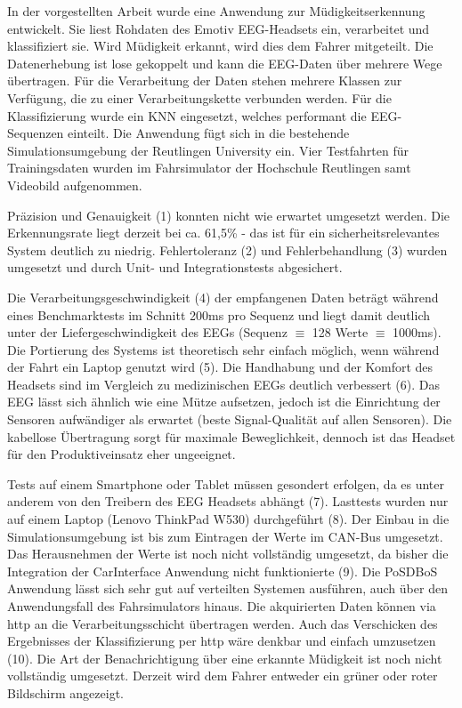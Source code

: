 \label{chap:result}
In der vorgestellten Arbeit wurde eine Anwendung zur Müdigkeitserkennung entwickelt. Sie liest Rohdaten des Emotiv EEG-Headsets ein, verarbeitet und klassifiziert sie. Wird Müdigkeit erkannt, wird dies dem Fahrer mitgeteilt. 
Die Datenerhebung ist lose gekoppelt und kann die EEG-Daten über mehrere Wege übertragen. Für die Verarbeitung der Daten stehen mehrere Klassen zur Verfügung, die zu einer Verarbeitungskette verbunden werden. Für die Klassifizierung wurde ein KNN eingesetzt, welches performant die EEG-Sequenzen einteilt. Die Anwendung fügt sich in die bestehende Simulationsumgebung der Reutlingen University ein. Vier Testfahrten für Trainingsdaten wurden im Fahrsimulator der Hochschule Reutlingen samt Videobild aufgenommen.

Präzision und Genauigkeit (1) konnten nicht wie erwartet umgesetzt werden. Die Erkennungsrate liegt derzeit bei ca. 61,5\% - das ist für ein sicherheitsrelevantes System deutlich zu niedrig. 
Fehlertoleranz (2) und Fehlerbehandlung (3) wurden umgesetzt und durch Unit- und Integrationstests abgesichert. 

Die Verarbeitungsgeschwindigkeit (4) der empfangenen Daten beträgt während eines Benchmarktests im Schnitt 200ms pro Sequenz und liegt damit deutlich unter der Liefergeschwindigkeit des EEGs (Sequenz $\equiv$ 128 Werte $\equiv$ 1000ms). 
Die Portierung des Systems ist theoretisch sehr einfach möglich, wenn während der Fahrt ein Laptop genutzt wird (5). Die Handhabung und der Komfort des Headsets sind im Vergleich zu medizinischen EEGs deutlich verbessert (6). Das EEG lässt sich ähnlich wie eine Mütze aufsetzen, jedoch ist die Einrichtung der Sensoren aufwändiger als erwartet (beste Signal-Qualität auf allen Sensoren). Die kabellose Übertragung sorgt für maximale Beweglichkeit, dennoch ist das Headset für den Produktiveinsatz eher ungeeignet.

Tests auf einem Smartphone oder Tablet müssen gesondert erfolgen, da es unter anderem von den Treibern des EEG Headsets abhängt (7). Lasttests wurden nur auf einem Laptop (Lenovo ThinkPad W530) durchgeführt (8). Der Einbau in die Simulationsumgebung ist bis zum Eintragen der Werte im CAN-Bus umgesetzt. Das Herausnehmen der Werte ist noch nicht vollständig umgesetzt, da bisher die Integration der CarInterface Anwendung nicht funktionierte (9). Die PoSDBoS Anwendung lässt sich sehr gut auf verteilten Systemen ausführen, auch über den Anwendungsfall des Fahrsimulators hinaus. Die akquirierten Daten können via http an die Verarbeitungsschicht übertragen werden. Auch das Verschicken des Ergebnisses der Klassifizierung per http wäre denkbar und einfach umzusetzen (10). Die Art der Benachrichtigung über eine erkannte Müdigkeit ist noch nicht vollständig umgesetzt. Derzeit wird dem Fahrer entweder ein grüner oder roter Bildschirm angezeigt.


